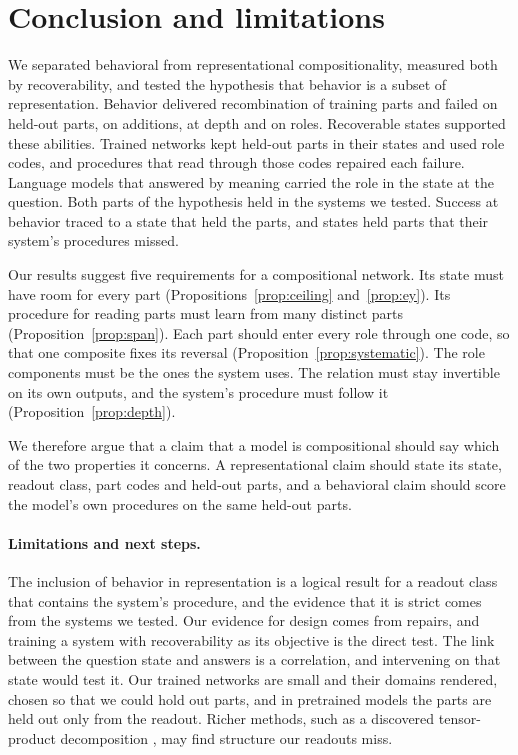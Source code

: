 \documentclass[10pt]{article}
\theoremstyle{plain}
\theoremstyle{remark}
\begin{document}
\section{Conclusion and limitations}
\label{sec:discussion}

We separated behavioral from representational compositionality, measured both by recoverability, and tested the hypothesis that behavior is a subset of representation. Behavior delivered recombination of training parts and failed on held-out parts, on additions, at depth and on roles. Recoverable states supported these abilities. Trained networks kept held-out parts in their states and used role codes, and procedures that read through those codes repaired each failure. Language models that answered by meaning carried the role in the state at the question. Both parts of the hypothesis held in the systems we tested. Success at behavior traced to a state that held the parts, and states held parts that their system's procedures missed.

Our results suggest five requirements for a compositional network. Its state must have room for every part (Propositions~\ref{prop:ceiling} and~\ref{prop:ey}). Its procedure for reading parts must learn from many distinct parts (Proposition~\ref{prop:span}). Each part should enter every role through one code, so that one composite fixes its reversal (Proposition~\ref{prop:systematic}). The role components must be the ones the system uses. The relation must stay invertible on its own outputs, and the system's procedure must follow it (Proposition~\ref{prop:depth}).

We therefore argue that a claim that a model is compositional should say which of the two properties it concerns. A representational claim should state its state, readout class, part codes and held-out parts, and a behavioral claim should score the model's own procedures on the same held-out parts.

\paragraph{Limitations and next steps.} The inclusion of behavior in representation is a logical result for a readout class that contains the system's procedure, and the evidence that it is strict comes from the systems we tested. Our evidence for design comes from repairs, and training a system with recoverability as its objective is the direct test. The link between the question state and answers is a correlation, and intervening on that state would test it. Our trained networks are small and their domains rendered, chosen so that we could hold out parts, and in pretrained models the parts are held out only from the readout. Richer methods, such as a discovered tensor-product decomposition \citep{mccoy2019}, may find structure our readouts miss.
\end{document}
